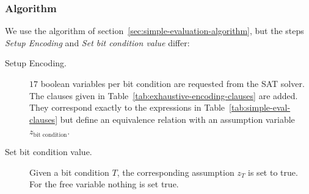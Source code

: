 \subsubsection{Algorithm}
\label{sec:exhaustive-encoding-algorithm}
%
We use the algorithm of section~\ref{sec:simple-evaluation-algorithm}, but the steps \emph{Setup Encoding} and \emph{Set bit condition value} differ:
%
\begin{description}
      \item[Setup Encoding.] $17$ boolean variables per bit condition are requested from the SAT solver. The clauses given in Table~\ref{tab:exhaustive-encoding-clauses} are added. They correspond exactly to the expressions in Table~\ref{tab:simple-eval-clauses} but define an equivalence relation with an assumption variable $z_{\text{bit condition}}$.
      \item[Set bit condition value.] Given a bit condition $T$, the corresponding assumption $z_T$ is set to true. For the free variable nothing is set true.
\end{description}

